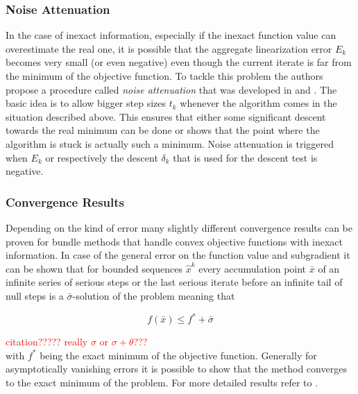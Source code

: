 \subsubsection{Noise Attenuation}

In the case of inexact information, especially if the inexact function value can overestimate the real one, it is possible that the aggregate linearization error \(E_k\) becomes very small (or even negative) even though the current iterate is far from the minimum of the objective function.
To tackle this problem the authors propose a procedure called \emph{noise attenuation} that was developed in \cite{Hintermueller2001} and \cite{Kiwiel2006}.
The basic idea is to allow bigger step sizes \(t_k\) whenever the algorithm comes in the situation described above. This ensures that either some significant descent towards the real minimum can be done or shows that the point where the algorithm is stuck is actually such a minimum.
Noise attenuation is triggered when \(E_k\) or respectively the descent \(\delta_k\) that is used for the descent test is negative.

\subsubsection{Convergence Results}
Depending on the kind of error many slightly different convergence results can be proven for bundle methods that handle convex objective functions with inexact information.
In case of the general error on the function value and subgradient it can be shown that for bounded sequences \(\hat{x}^k\) every accumulation point \(\bar{x}\) of an infinite series of serious steps or the last serious iterate before an infinite tail of null steps is a \(\bar{\sigma}\)-solution of the problem meaning that 

\begin{equation}
	f(\bar{x}) \leq f^*+\bar{\sigma} 
\end{equation}

\textcolor{red}{citation????? really \(\sigma\) or \(\sigma+\theta\)???}\\
with \(f^*\) being the exact minimum of the objective function.
Generally for asymptotically vanishing errors it is possible to show that the method converges to the exact minimum of the problem.
For more detailed results refer to \cite{Oliveira2014}.


